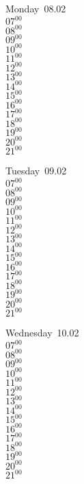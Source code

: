 \documentclass[11pt,a4paper]{book}\usepackage[]{graphicx}\usepackage[]{color}
\begin{document}
\begin{headerbox}
\end{headerbox}
\begin{weekdaybox}
  Monday~08.02\\
  { 
  \vfill
  $07^{00}$\\
$08^{00}$\\
$09^{00}$\\
$10^{00}$\\
$11^{00}$\\
$12^{00}$\\
$13^{00}$\\
$14^{00}$\\
$15^{00}$\\
$16^{00}$\\
$17^{00}$\\
$18^{00}$\\
$19^{00}$\\
$20^{00}$\\
$21^{00}$\\
  }
\end{weekdaybox}
\begin{weekdaybox}
  Tuesday~09.02\\
  { 
  \vfill
  $07^{00}$\\
$08^{00}$\\
$09^{00}$\\
$10^{00}$\\
$11^{00}$\\
$12^{00}$\\
$13^{00}$\\
$14^{00}$\\
$15^{00}$\\
$16^{00}$\\
$17^{00}$\\
$18^{00}$\\
$19^{00}$\\
$20^{00}$\\
$21^{00}$\\
  }
\end{weekdaybox}
\begin{weekdaybox}
  Wednesday~10.02\\
  { 
  \vfill
  $07^{00}$\\
$08^{00}$\\
$09^{00}$\\
$10^{00}$\\
$11^{00}$\\
$12^{00}$\\
$13^{00}$\\
$14^{00}$\\
$15^{00}$\\
$16^{00}$\\
$17^{00}$\\
$18^{00}$\\
$19^{00}$\\
$20^{00}$\\
$21^{00}$\\
  }
\end{weekdaybox}
\end{document}
